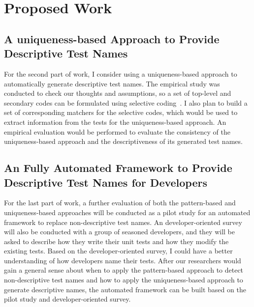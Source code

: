 \section{Proposed Work}

\subsection{A uniqueness-based Approach to Provide Descriptive Test Names}
\label{sec:unique-test-name}

For the second part of work, I consider using a uniqueness-based approach to automatically generate descriptive test names.
%
The empirical study was conducted to check our thoughts and assumptions, so a set of top-level and secondary codes can be formulated using selective coding~\cite{glaser1967discovery,strauss1998basics}.
%
I also plan to build a set of corresponding matchers for the selective codes, which would be used to extract information from the tests for the uniqueness-based approach.
%
An empirical evaluation would be performed to evaluate the consistency of the uniqueness-based approach and the descriptiveness of its generated test names.


\subsection{An Fully Automated Framework to Provide Descriptive Test Names for Developers}

For the last part of work, a further evaluation of both the pattern-based and uniqueness-based approaches will be conducted as a pilot study for an automated framework to replace non-descriptive test names.
%
An developer-oriented survey will also be conducted with a group of seasoned developers, and they will be asked to describe how they write their unit tests and how they modify the existing tests.
%
Based on the developer-oriented survey, I could have a better understanding of how developers name their tests.
%
After our researchers would gain a general sense about when to apply the pattern-based approach to detect non-descriptive test names and how to apply the uniqueness-based approach to generate descriptive names, the automated framework can be built based on the pilot study and developer-oriented survey.



